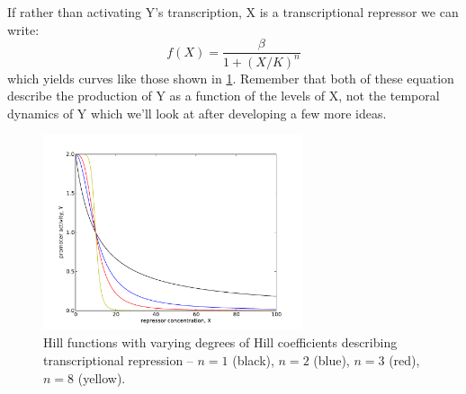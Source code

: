 \documentclass[11pt,letterpaper,oneside,pagesize]{scrartcl}
\begin{document}
If rather than activating Y's transcription, X is a transcriptional repressor we can write:
%
\[
f(X) = \frac{\beta}{1 + (X/K)^n}
\]
%
which yields curves like those shown in \cref{fig:hillrepr}.  Remember that both of these equation describe the production of Y as a function of the levels of X, not the temporal dynamics of Y which we'll look at after developing a few more ideas.

\begin{figure}[lh]
\centering
 \includegraphics[width=3in]{hillrepr.pdf}
\caption{Hill functions with varying degrees of Hill coefficients describing transcriptional repression -- $n=1$ (black), $n=2$ (blue), $n=3$ (red), $n=8$ (yellow).}
\label{fig:hillrepr}
\end{figure}




\end{document}
